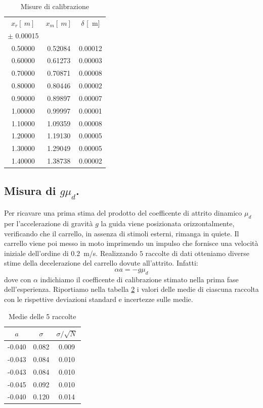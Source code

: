 \documentclass[10pt,oneside,a4paper]{article}
\begin{document}
\begin{table}
\caption{Misure di calibrazione}
\label{tab:calibrazione}
\centering
\begin{tabular}{c|cc}
\hline
$x_r [\SI{}{m}]$ & $x_m [\SI{}{m}]$ & $\delta$ [\SI{}{m}] \\
$\pm$ 0.00015 && \\
\hline
0.50000 & 0.52084 & 0.00012 \\
0.60000 & 0.61273 & 0.00003 \\
0.70000 & 0.70871 & 0.00008 \\
0.80000 & 0.80446 & 0.00002 \\
0.90000 & 0.89897 & 0.00007 \\
1.00000 & 0.99997 & 0.00001 \\
1.10000 & 1.09359 & 0.00008 \\
1.20000 & 1.19130 & 0.00005 \\
1.30000 & 1.29049 & 0.00005 \\
1.40000 & 1.38738 & 0.00002 \\
\hline
\end{tabular}
\end{table}

\subsection{Misura di $g\mu_d$.}
Per ricavare una prima stima del prodotto del coefficente di attrito dinamico $\mu_d$ per l'accelerazione di gravità $g$ la guida viene posizionata orizzontalmente, verificando che il carrello, in assenza di stimoli esterni, rimanga in quiete. Il carrello viene poi messo in moto imprimendo un impulso che fornisce una velocità iniziale dell'ordine di \SI{0.2}{m/s}.
Realizzando $5$ raccolte di dati otteniamo diverse stime della decelerazione del carrello dovute all'attrito. Infatti: 
\begin{equation}\label{eq:accelerazione1}
	\alpha a=-g\mu_d
\end{equation}
dove con $\alpha$ indichiamo il coefficente di calibrazione stimato nella prima fase dell'esperienza. \newline
Riportiamo nella tabella \ref{tab:medieacc} i valori delle medie di ciascuna raccolta con le rispettive deviazioni standard e incertezze sulle medie.
\begin{table}
	\caption{Medie delle 5 raccolte}
	\label{tab:medieacc}
	\centering
	\begin{tabular}{ccc}
		\hline
	    $ a $ & $ \sigma $ & $\sigma/\sqrt{N}$ \\
		\hline
		 -0.040 & 0.082 & 0.009 \\
		 -0.043 & 0.084 & 0.010 \\
		 -0.043 & 0.084 & 0.010 \\
		 -0.045 & 0.092 & 0.010 \\
		 -0.040 & 0.120 & 0.014 \\
		\hline
	\end{tabular}
\end{table}
\end{document}
